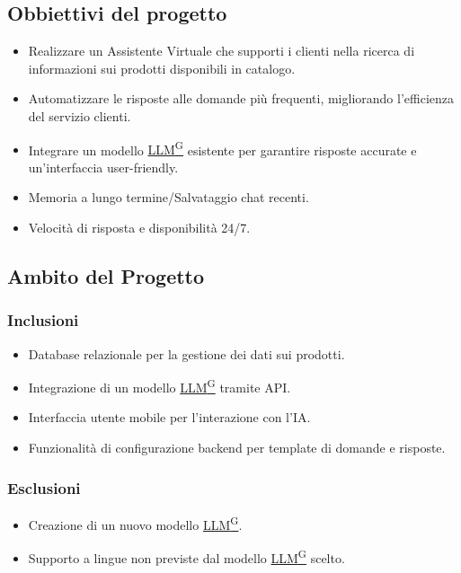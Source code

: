 \documentclass{article}
\begin{document}
    \subsection{Obbiettivi del progetto}
    \begin{itemize}
        \item Realizzare un Assistente Virtuale che supporti i clienti nella ricerca
        di informazioni sui prodotti disponibili in catalogo.
        \item Automatizzare le risposte alle domande più frequenti, migliorando
        l'efficienza del servizio clienti.
        \item Integrare un modello \href{https://code7crusaders.github.io/docs/PB/documentazione_interna/glossario.html#llm-large-language-model}{LLM\textsuperscript{G}} esistente per garantire risposte accurate e
        un'interfaccia user-friendly.
        \item Memoria a lungo termine/Salvataggio chat recenti.
        \item Velocità di risposta e disponibilità 24/7.
    \end{itemize}

    \subsection{Ambito del Progetto}

        \subsubsection{Inclusioni}
        \begin{itemize}
            \item Database relazionale per la gestione dei dati sui prodotti.
            \item Integrazione di un modello \href{https://code7crusaders.github.io/docs/PB/documentazione_interna/glossario.html#llm-large-language-model}{LLM\textsuperscript{G}} tramite API.
            \item Interfaccia utente mobile per l'interazione con l'IA.
            \item Funzionalità di configurazione backend per template di domande e risposte.
        \end{itemize}
        \subsubsection{Esclusioni}
        \begin{itemize}
            \item Creazione di un nuovo modello \href{https://code7crusaders.github.io/docs/PB/documentazione_interna/glossario.html#llm-large-language-model}{LLM\textsuperscript{G}}.
            \item Supporto a lingue non previste dal modello \href{https://code7crusaders.github.io/docs/PB/documentazione_interna/glossario.html#llm-large-language-model}{LLM\textsuperscript{G}} scelto.
        \end{itemize}
\end{document}
